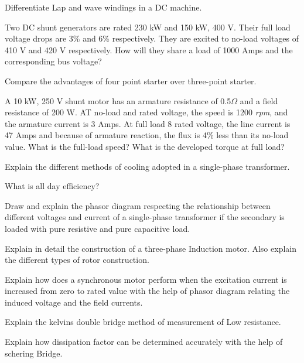\markB

\newpage \again

\partCo

\item \iitem \iitem Differentiate Lap and wave windings in a DC machine. 
\item Two DC shunt generators are rated 230 kW and 150 kW, 400 V. Their
  full load voltage drops are 3\% and 6\% respectively. They are excited
  to no-load voltages of 410 V and 420 V respectively. How will they share
  a load of 1000 Amps and the corresponding bus voltage? 
\ene
\Or
\item \iitem Compare the advantages of four point starter over three-point
  starter. 
\item A 10 kW, 250 V shunt motor has an armature resistance of 0.5$\Omega$ and
  a field resistance of 200 W. AT no-load and rated voltage, the speed is 1200
  \emph{rpm}, and the armature current is 3 Amps. At full load 8 rated voltage,
  the line current is 47 Amps and because of armature reaction, the flux is 4\%
  less than its no-load value. What is the full-load speed? What is the developed
  torque at full load? 
  \ene
\ene

\item \iitem Explain the different methods of cooling adopted in a single-phase
  transformer. 
\Or
\item \iitem What is all day efficiency? 
\item Draw and explain the phasor diagram respecting the relationship between
  different voltages and current of a single-phase transformer if the secondary
  is loaded with pure resistive and pure capacitive load. 
  \ene
\ene

\item \iitem Explain in detail the construction of a three-phase Induction motor.
  Also explain the different types of rotor construction. 
\Or
\item Explain how does a synchronous motor perform when the excitation current is
  increased from zero to rated value with the help of phasor diagram relating the
  induced voltage and the field currents. 
\ene

\item \iitem Explain the kelvins double bridge method of measurement of Low
  resistance. 
\Or
\item Explain how dissipation factor can be determined accurately with the help
  of schering Bridge. 
\ene

